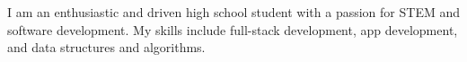 

\begin{cvparagraph}
    I am an enthusiastic and driven high school student with a passion for STEM and software development. My skills include full-stack development, app development, and data structures and algorithms.
\end{cvparagraph}